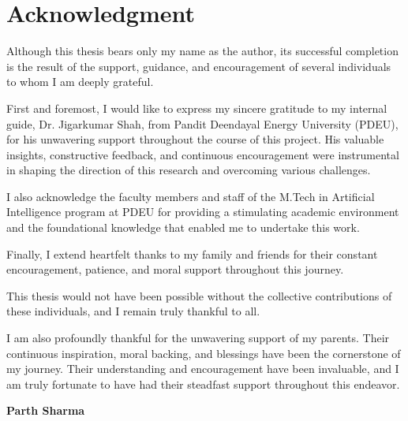 
\section*{\textcolor{internationalkleinblue}{\textbf{Acknowledgment}}}
\vspace{1.2cm}
Although this thesis bears only my name as the author, its successful completion is the result of the support, guidance, and encouragement of several individuals to whom I am deeply grateful.

First and foremost, I would like to express my sincere gratitude to my internal guide, Dr. Jigarkumar Shah, from Pandit Deendayal Energy University (PDEU), for his unwavering support throughout the course of this project. His valuable insights, constructive feedback, and continuous encouragement were instrumental in shaping the direction of this research and overcoming various challenges.

I also acknowledge the faculty members and staff of the M.Tech in Artificial Intelligence program at PDEU for providing a stimulating academic environment and the foundational knowledge that enabled me to undertake this work.

Finally, I extend heartfelt thanks to my family and friends for their constant encouragement, patience, and moral support throughout this journey.

This thesis would not have been possible without the collective contributions of these individuals, and I remain truly thankful to all.

I am also profoundly thankful for the unwavering support of my parents. Their continuous inspiration, moral backing, and blessings have been the cornerstone of my journey. Their understanding and encouragement have been invaluable, and I am truly fortunate to have had their steadfast support throughout this endeavor.

\vspace{1.0cm}
\begin{flushright}
\textbf{Parth Sharma}\\
\end{flushright}
